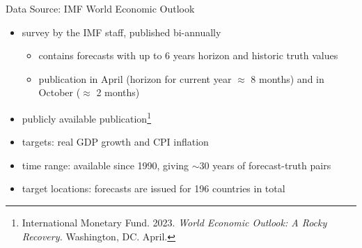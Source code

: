 \documentclass[en]{sdqbeamer}
\begin{document}
\begin{frame}{Data Source: IMF World Economic Outlook}
	\begin{itemize}
		\item survey by the IMF staff, published bi-annually
		\begin{itemize}
            \item contains forecasts with up to 6 years horizon and historic truth values
		    \item publication in April (horizon for current year $\approx$ 8 months) and in October ($\approx$ 2 months)
		\end{itemize}
    \item publicly available publication\footnote{International Monetary Fund. 2023. \textit{World Economic Outlook: A Rocky Recovery.} Washington, DC. April.}
    \item targets: real GDP growth and CPI inflation 
    \item time range: available since 1990, giving $\sim$30 years of forecast-truth pairs %
    \item target locations: forecasts are issued for 196 countries in total
	\end{itemize}
\end{frame}
\end{document}
